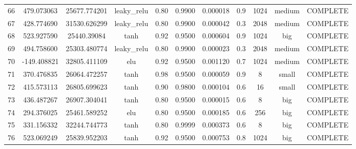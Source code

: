 \begin{longtable}{ccccccccccc}
                       66 &                 479.073063 &                       25677.774201 &     leaky\_relu &        0.80 & 0.9900 &       0.000018 &             0.9 &     1024 &    medium & COMPLETE \\
                       67 &                 428.774690 &                       31530.626299 &     leaky\_relu &        0.80 & 0.9900 &       0.000042 &             0.3 &     2048 &    medium & COMPLETE \\
                       68 &                 523.927590 &                        25440.39084 &            tanh &        0.92 & 0.9500 &       0.000604 &             0.9 &     1024 &       big & COMPLETE \\
                       69 &                 494.758600 &                       25303.480774 &     leaky\_relu &        0.80 & 0.9900 &       0.000023 &             0.3 &     2048 &    medium & COMPLETE \\
                       70 &                -149.408821 &                       32805.411109 &             elu &        0.92 & 0.9500 &       0.001120 &             0.7 &     1024 &    medium & COMPLETE \\
                       71 &                 370.476835 &                       26064.472257 &            tanh &        0.98 & 0.9500 &       0.000059 &             0.9 &        8 &     small & COMPLETE \\
                       72 &                 415.573113 &                       26805.699623 &            tanh &        0.90 & 0.9800 &       0.000104 &             0.6 &       16 &     small & COMPLETE \\
                       73 &                 436.487267 &                       26907.304041 &            tanh &        0.80 & 0.9500 &       0.000015 &             0.6 &        8 &       big & COMPLETE \\
                       74 &                 294.376025 &                       25461.589252 &             elu &        0.80 & 0.9500 &       0.000185 &             0.6 &      256 &       big & COMPLETE \\
                       75 &                 331.156332 &                       32244.744773 &            tanh &        0.80 & 0.9999 &       0.000373 &             0.6 &        8 &       big & COMPLETE \\
                       76 &                 523.069249 &                       25839.952203 &            tanh &        0.92 & 0.9500 &       0.000753 &             0.8 &     1024 &       big & COMPLETE \\

\end{longtable}
